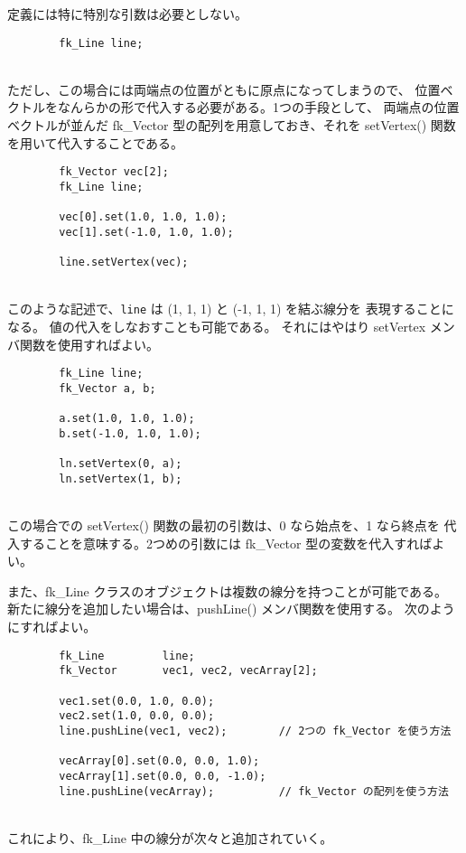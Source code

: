 定義には特に特別な引数は必要としない。
\\
\begin{screen}
\begin{verbatim}
        fk_Line line;
\end{verbatim}
\end{screen}
~ \\
ただし、この場合には両端点の位置がともに原点になってしまうので、
位置ベクトルをなんらかの形で代入する必要がある。1つの手段として、
両端点の位置ベクトルが並んだ fk\_Vector 型の配列を用意しておき、それを
setVertex() 関数を用いて代入することである。
\\
\begin{breakbox}
\begin{verbatim}
        fk_Vector vec[2];
        fk_Line line;

        vec[0].set(1.0, 1.0, 1.0);
        vec[1].set(-1.0, 1.0, 1.0);

        line.setVertex(vec);
\end{verbatim}
\end{breakbox}
~ \\
このような記述で、\verb+line+ は (1, 1, 1) と (-1, 1, 1) を結ぶ線分を
表現することになる。
値の代入をしなおすことも可能である。
それにはやはり setVertex メンバ関数を使用すればよい。
\\
\begin{breakbox}
\begin{verbatim}
        fk_Line line;
        fk_Vector a, b;

        a.set(1.0, 1.0, 1.0);
        b.set(-1.0, 1.0, 1.0);

        ln.setVertex(0, a);
        ln.setVertex(1, b);
\end{verbatim}
\end{breakbox}
~ \\
この場合での setVertex() 関数の最初の引数は、0 なら始点を、1 なら終点を
代入することを意味する。2つめの引数には fk\_Vector 型の変数を代入すればよい。

また、fk\_Line クラスのオブジェクトは複数の線分を持つことが可能である。
新たに線分を追加したい場合は、pushLine() メンバ関数を使用する。
次のようにすればよい。
\\
\begin{breakbox}
\begin{verbatim}
        fk_Line         line;
        fk_Vector       vec1, vec2, vecArray[2];

        vec1.set(0.0, 1.0, 0.0);
        vec2.set(1.0, 0.0, 0.0);
        line.pushLine(vec1, vec2);        // 2つの fk_Vector を使う方法

        vecArray[0].set(0.0, 0.0, 1.0);
        vecArray[1].set(0.0, 0.0, -1.0);
        line.pushLine(vecArray);          // fk_Vector の配列を使う方法
\end{verbatim}
\end{breakbox}
~ \\
これにより、fk\_Line 中の線分が次々と追加されていく。

